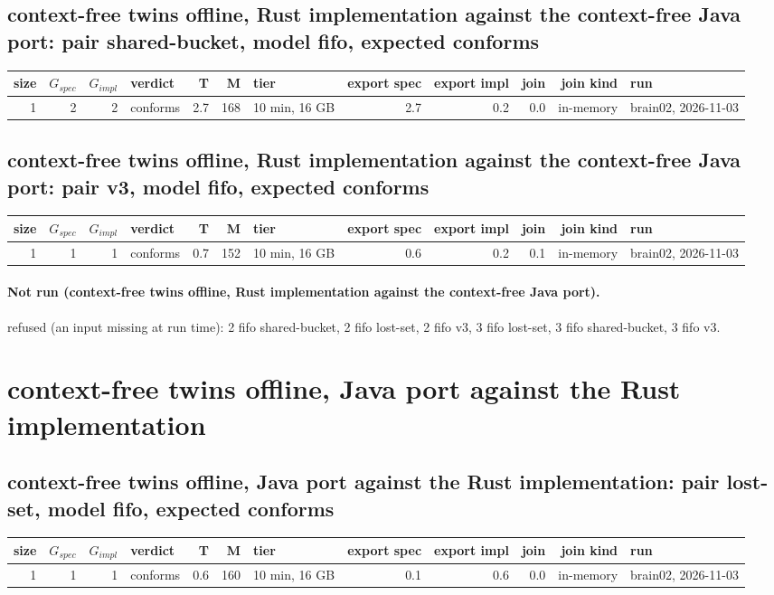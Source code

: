 \documentclass[10pt]{article}
\begin{document}
\subsection*{context-free twins offline, Rust implementation against the context-free Java port: pair \textsf{shared-bucket}, model fifo, expected conforms}
\begin{longtable}{@{}rrrlrrlrrrrl@{}}
\toprule
size & $G_{\mathit{spec}}$ & $G_{\mathit{impl}}$ & verdict & T & M & tier & export spec & export impl & join & join kind & run \\
\midrule
\endhead
\color{red} 1 & 2 & 2 & conforms & 2.7 & 168 & 10 min, 16 GB & 2.7 & 0.2 & 0.0 & in-memory & brain02, 2026-11-03 \\
\bottomrule
\end{longtable}
\subsection*{context-free twins offline, Rust implementation against the context-free Java port: pair \textsf{v3}, model fifo, expected conforms}
\begin{longtable}{@{}rrrlrrlrrrrl@{}}
\toprule
size & $G_{\mathit{spec}}$ & $G_{\mathit{impl}}$ & verdict & T & M & tier & export spec & export impl & join & join kind & run \\
\midrule
\endhead
\color{red} 1 & 1 & 1 & conforms & 0.7 & 152 & 10 min, 16 GB & 0.6 & 0.2 & 0.1 & in-memory & brain02, 2026-11-03 \\
\bottomrule
\end{longtable}
\paragraph{Not run (context-free twins offline, Rust implementation against the context-free Java port).}
refused (an input missing at run time): 2 fifo shared-bucket, 2 fifo lost-set, 2 fifo v3, 3 fifo lost-set, 3 fifo shared-bucket, 3 fifo v3.\par
\section*{context-free twins offline, Java port against the Rust implementation}
\subsection*{context-free twins offline, Java port against the Rust implementation: pair \textsf{lost-set}, model fifo, expected conforms}
\begin{longtable}{@{}rrrlrrlrrrrl@{}}
\toprule
size & $G_{\mathit{spec}}$ & $G_{\mathit{impl}}$ & verdict & T & M & tier & export spec & export impl & join & join kind & run \\
\midrule
\endhead
\color{red} 1 & 1 & 1 & conforms & 0.6 & 160 & 10 min, 16 GB & 0.1 & 0.6 & 0.0 & in-memory & brain02, 2026-11-03 \\
\bottomrule
\end{longtable}
\end{document}
